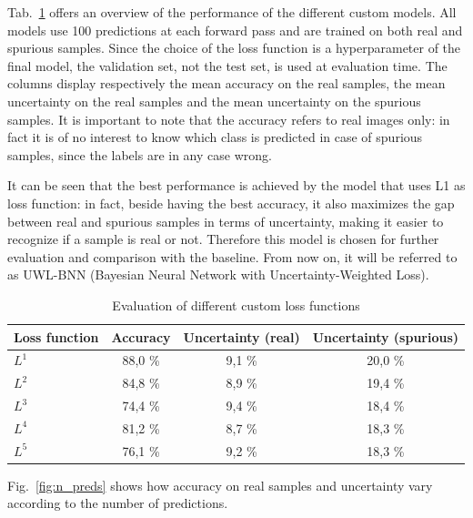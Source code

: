 \documentclass[11pt,twoside,a4paper]{article}
\begin{document}
Tab.~\ref{tab:custom} offers an overview of the performance of the different custom models. All models use 100 predictions at each forward pass and are trained on both real and spurious samples. Since the choice of the loss function is a hyperparameter of the final model, the validation set, not the test set, is used at evaluation time. The columns display respectively the mean accuracy on the real samples, the mean uncertainty on the real samples and the mean uncertainty on the spurious samples.
It is important to note that the accuracy refers to real images only: in fact it is of no interest to know which class is predicted in case of spurious samples, since the labels are in any case wrong.

It can be seen that the best performance is achieved by the model that uses L1 as loss function: in fact, beside having the best accuracy, it also maximizes the gap between real and spurious samples in terms of uncertainty, making it easier to recognize if a sample is real or not. Therefore this model is chosen for further evaluation and comparison with the baseline. From now on, it will be referred to as UWL-BNN (Bayesian Neural Network with Uncertainty-Weighted Loss).

\begin{table}[!h]
  \begin{adjustwidth}{-.5in}{-.5in}
  \begin{center}
    \begin{tabular}{l | c | c | c}
      Loss function	& Accuracy	& Uncertainty (real)	& Uncertainty (spurious) \\
      \hline
      \(L^1\)		& 88,0 \%		& 9,1  \% 			& 20,0 \% \\      
      \(L^2\)		& 84,8 \%		& 8,9 \% 			& 19,4 \% \\      
      \(L^3\)		& 74,4 \%		& 9,4 \% 			& 18,4 \% \\      
      \(L^4\)		& 81,2 \%		& 8,7 \% 			& 18,3 \% \\      
      \(L^5\)		& 76,1 \%		& 9,2 \% 			& 18,3 \% \\      
    \end{tabular}
    \caption{Evaluation of different custom loss functions}
    \label{tab:custom}
  \end{center}
  \end{adjustwidth}
\end{table}

Fig.~\ref{fig:n_preds} shows how accuracy on real samples and uncertainty vary according to the number of predictions.
\end{document}
